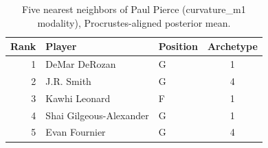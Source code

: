 \begin{table}[htbp]
  \centering\small
  \begin{tabular}{rllc}
    \toprule
    Rank & Player & Position & Archetype \\
    \midrule
    1 & DeMar DeRozan & G & 1 \\
    2 & J.R. Smith & G & 4 \\
    3 & Kawhi Leonard & F & 1 \\
    4 & Shai Gilgeous-Alexander & G & 1 \\
    5 & Evan Fournier & G & 4 \\
    \bottomrule
  \end{tabular}
  \caption{Five nearest neighbors of Paul Pierce (curvature_m1 modality), Procrustes-aligned posterior mean.}
  \label{tab:Paul_Pierce_neighbors_curvature_m1}
\end{table}

